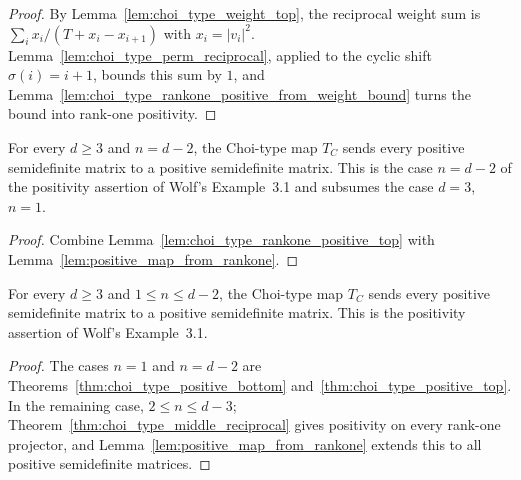 \begin{proof}
    \leanok
    By Lemma~\ref{lem:choi_type_weight_top}, the reciprocal weight sum is
    $\sum_i x_i/(T+x_i-x_{i+1})$ with $x_i=|v_i|^2$.
    Lemma~\ref{lem:choi_type_perm_reciprocal}, applied to the cyclic shift
    $\sigma(i)=i+1$, bounds this sum by $1$, and
    Lemma~\ref{lem:choi_type_rankone_positive_from_weight_bound} turns the
    bound into rank-one positivity.
\end{proof}

\begin{theorem}
    \label{thm:choi_type_positive_top}
    \leanok
    For every $d\ge3$ and $n=d-2$, the Choi-type map $T_C$ sends every
    positive semidefinite matrix to a positive semidefinite matrix. This is
    the case $n=d-2$ of the positivity assertion of Wolf's Example~3.1 and
    subsumes the case $d=3$, $n=1$.
\end{theorem}

\begin{proof}
    \leanok
    Combine Lemma~\ref{lem:choi_type_rankone_positive_top} with
    Lemma~\ref{lem:positive_map_from_rankone}.
\end{proof}

\begin{theorem}
    \label{thm:choi_type_positive}
    \leanok
    For every $d\ge3$ and $1\le n\le d-2$, the Choi-type map $T_C$ sends
    every positive semidefinite matrix to a positive semidefinite matrix.
    This is the positivity assertion of Wolf's Example~3.1.
\end{theorem}

\begin{proof}
    \leanok
    The cases $n=1$ and $n=d-2$ are
    Theorems~\ref{thm:choi_type_positive_bottom}
    and~\ref{thm:choi_type_positive_top}. In the remaining case,
    $2\le n\le d-3$; Theorem~\ref{thm:choi_type_middle_reciprocal} gives
    positivity on every rank-one projector, and
    Lemma~\ref{lem:positive_map_from_rankone} extends this to all positive
    semidefinite matrices.
\end{proof}

